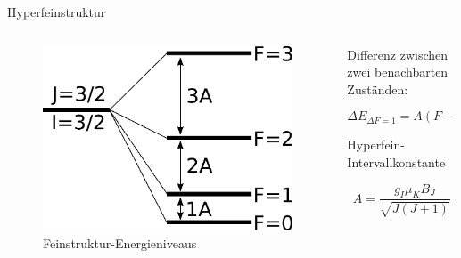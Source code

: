 \documentclass{beamer}
\begin{document}
\begin{frame}{Hyperfeinstruktur}
\begin{columns}
\begin{column}{4.5cm}
	\begin{figure}[H]
	\centering \includegraphics[width=\textwidth]{Bilder/hfstheo.pdf}
	\caption{Feinstruktur-Energieniveaus}
	\end{figure}
\end{column}
\begin{column}{5.5cm}
Differenz zwischen zwei benachbarten Zuständen:

$$\Delta E_{\Delta F = 1} = A(F+1)$$

Hyperfein-Intervallkonstante

$$ A = \frac{g_I\mu_KB_J}{\sqrt{J(J+1)}} $$

\end{column}
\end{columns}
\end{frame}
\end{document}
